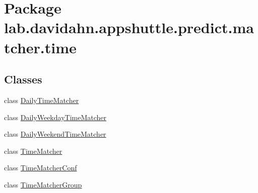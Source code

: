\hypertarget{namespacelab_1_1davidahn_1_1appshuttle_1_1predict_1_1matcher_1_1time}{\section{\-Package lab.\-davidahn.\-appshuttle.\-predict.\-matcher.\-time}
\label{namespacelab_1_1davidahn_1_1appshuttle_1_1predict_1_1matcher_1_1time}
}
\subsection*{\-Classes}
\begin{DoxyCompactItemize}
\item 
class \hyperlink{classlab_1_1davidahn_1_1appshuttle_1_1predict_1_1matcher_1_1time_1_1_daily_time_matcher}{\-Daily\-Time\-Matcher}
\item 
class \hyperlink{classlab_1_1davidahn_1_1appshuttle_1_1predict_1_1matcher_1_1time_1_1_daily_weekday_time_matcher}{\-Daily\-Weekday\-Time\-Matcher}
\item 
class \hyperlink{classlab_1_1davidahn_1_1appshuttle_1_1predict_1_1matcher_1_1time_1_1_daily_weekend_time_matcher}{\-Daily\-Weekend\-Time\-Matcher}
\item 
class \hyperlink{classlab_1_1davidahn_1_1appshuttle_1_1predict_1_1matcher_1_1time_1_1_time_matcher}{\-Time\-Matcher}
\item 
class \hyperlink{classlab_1_1davidahn_1_1appshuttle_1_1predict_1_1matcher_1_1time_1_1_time_matcher_conf}{\-Time\-Matcher\-Conf}
\item 
class \hyperlink{classlab_1_1davidahn_1_1appshuttle_1_1predict_1_1matcher_1_1time_1_1_time_matcher_group}{\-Time\-Matcher\-Group}
\end{DoxyCompactItemize}
